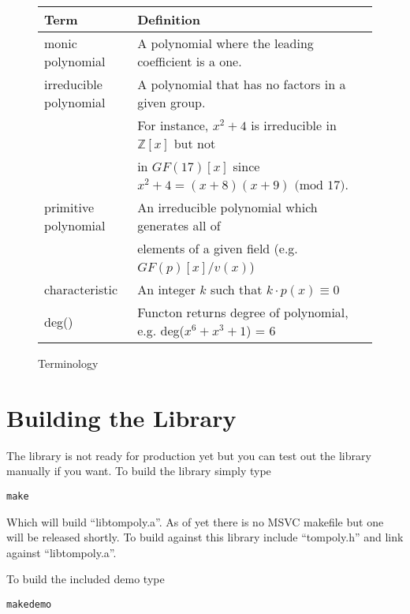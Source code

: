 \documentclass[b5paper]{book}
\def\Z{{\mathbb Z}}
\begin{document}
\begin{figure}[here]
\begin{center}
\begin{small}
\begin{tabular}{|l|l|}
\hline \textbf{Term} & \textbf{Definition} \\
\hline monic polynomial & A polynomial where the leading coefficient is a one. \\
\hline irreducible polynomial & A polynomial that has no factors in a given group.  \\
                              & For instance, $x^2 + 4$ is irreducible in $\Z[x]$ but not \\
                              & in $GF(17)[x]$ since $x^2 + 4 = (x+8)(x+9) \mbox{ (mod }17\mbox{)}$.  \\
\hline primitive polynomial   & An irreducible polynomial which generates all of \\
                              & elements of a given field (e.g. $GF(p)[x]/v(x)$) \\
\hline characteristic         & An integer $k$ such that $k \cdot p(x) \equiv 0$  \\
\hline deg()                  & Functon returns degree of polynomial, e.g. deg($x^6 + x^3 + 1$) = 6 \\
\hline
\end{tabular}
\end{small}
\end{center}
\caption{Terminology}
\end{figure} 

\section{Building the Library}
The library is not ready for production yet but you can test out the library manually if you want.  To build the library 
simply type

\begin{alltt}
make
\end{alltt}

Which will build ``libtompoly.a''.  As of yet there is no MSVC makefile but one will be released shortly.  To build against
this library include ``tompoly.h'' and link against ``libtompoly.a''.

To build the included demo type 

\begin{alltt}
make demo
\end{alltt}
\end{document}
